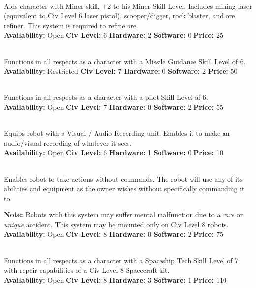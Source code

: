 \\
Aids character with Miner skill, +2 to his Miner Skill Level. Includes mining laser (equivalent to Civ Level 6 laser pistol), scooper/digger, 
rock blaster, and ore refiner. This system is required to refine ore. 
\\
\textbf{Availability:} Open \textbf{Civ Level:} 6 \textbf{Hardware:} 2 \textbf{Software:} 0 \textbf{Price:} 25 

\\
Functions in all respects as a character with a Missile Guidance Skill Level of 6. 
\\
\textbf{Availability:} Restricted \textbf{Civ Level:} 7 \textbf{Hardware:} 0 \textbf{Software:} 2 \textbf{Price:} 50 

\\
Functions in all respects as a character with a pilot Skill Level of 6. 
\\
\textbf{Availability:} Open \textbf{Civ Level:} 7 \textbf{Hardware:} 0 \textbf{Software:} 2 \textbf{Price:} 55 

\\
Equips robot with a Visual / Audio Recording unit. Enables it to make an audio/visual recording of whatever it sees. 
\\
\textbf{Availability:} Open \textbf{Civ Level:} 6 \textbf{Hardware:} 1 \textbf{Software:} 0 \textbf{Price:} 10 

\\
Enables robot to take actions without commands. The robot will use any of its abilities and equipment as the owner wishes without 
specifically commanding it to. 

\textbf{Note:} Robots with this system may suffer mental malfunction
due to a \emph{rare} or \emph{unique} accident. This system may be
mounted only on Civ Level 8 robots.
\\
\textbf{Availability:} Open \textbf{Civ Level:} 8 \textbf{Hardware:} 0
\textbf{Software:} 2 \textbf{Price:} 75

\\
Functions in all respects as a character with a Spaceship Tech Skill Level of 7 with repair capabilities of a Civ Level 8 Spacecraft kit. 
\\
\textbf{Availability:} Open \textbf{Civ Level:} 8 \textbf{Hardware:} 3 \textbf{Software:} 1 \textbf{Price:} 110 

